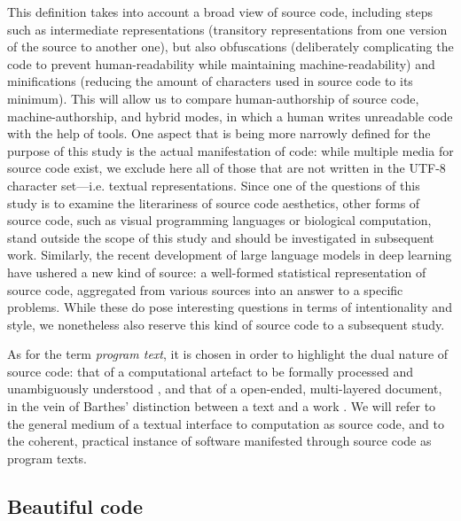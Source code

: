 This definition takes into account a broad view of source code, including steps such as intermediate representations (transitory representations from one version of the source to another one), but also obfuscations (deliberately complicating the code to prevent human-readability while maintaining machine-readability) and minifications (reducing the amount of characters used in source code to its minimum). This will allow us to compare human-authorship of source code, machine-authorship, and hybrid modes, in which a human writes unreadable code with the help of tools. One aspect that is being more narrowly defined for the purpose of this study is the actual manifestation of code: while multiple media for source code exist, we exclude here all of those that are not written in the UTF-8 character set—i.e. textual representations. Since one of the questions of this study is to examine the literariness of source code aesthetics, other forms of source code, such as visual programming languages or biological computation, stand outside the scope of this study and should be investigated in subsequent work. Similarly, the recent development of large language models in deep learning have ushered a new kind of source: a well-formed statistical representation of source code, aggregated from various sources into an answer to a specific problems. While these do pose interesting questions in terms of intentionality and style, we nonetheless also reserve this kind of source code to a subsequent study.

As for the term \emph{program text}, it is chosen in order to highlight the dual nature of source code: that of a computational artefact to be formally processed and unambiguously understood \citep{detienne_software_2012}, and that of a open-ended, multi-layered document, in the vein of Barthes' distinction between a text and a work \citep{barthes_bruissement_1984}. We will refer to the general medium of a textual interface to computation as source code, and to the coherent, practical instance of software manifested through source code as program texts.

\subsection{Beautiful code}
\label{subsec:beautiful-code}

